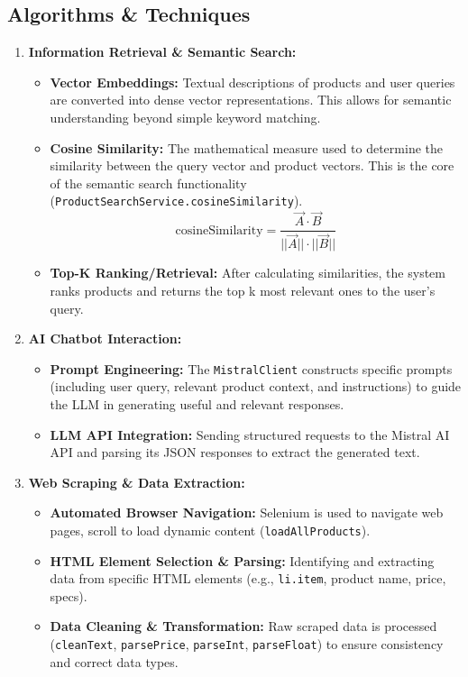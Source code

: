 \documentclass{article}
\begin{document}
\subsection{Algorithms \& Techniques}
\begin{enumerate}
    \item \textbf{Information Retrieval \& Semantic Search:}
    \begin{itemize}
        \item \textbf{Vector Embeddings:} Textual descriptions of products and user queries are converted into dense vector representations. This allows for semantic understanding beyond simple keyword matching.
        \item \textbf{Cosine Similarity:} The mathematical measure used to determine the similarity between the query vector and product vectors. This is the core of the semantic search functionality (\texttt{ProductSearchService.cosineSimilarity}).
        \[ \text{cosineSimilarity} = \frac{\vec{A} \cdot \vec{B}}{||\vec{A}|| \cdot ||\vec{B}||} \]
        \item \textbf{Top-K Ranking/Retrieval:} After calculating similarities, the system ranks products and returns the top k most relevant ones to the user's query.
    \end{itemize}
    \item \textbf{AI Chatbot Interaction:}
    \begin{itemize}
        \item \textbf{Prompt Engineering:} The \texttt{MistralClient} constructs specific prompts (including user query, relevant product context, and instructions) to guide the LLM in generating useful and relevant responses.
        \item \textbf{LLM API Integration:} Sending structured requests to the Mistral AI API and parsing its JSON responses to extract the generated text.
    \end{itemize}
    \item \textbf{Web Scraping \& Data Extraction:}
    \begin{itemize}
        \item \textbf{Automated Browser Navigation:} Selenium is used to navigate web pages, scroll to load dynamic content (\texttt{loadAllProducts}).
        \item \textbf{HTML Element Selection \& Parsing:} Identifying and extracting data from specific HTML elements (e.g., \texttt{li.item}, product name, price, specs).
        \item \textbf{Data Cleaning \& Transformation:} Raw scraped data is processed (\texttt{cleanText}, \texttt{parsePrice}, \texttt{parseInt}, \texttt{parseFloat}) to ensure consistency and correct data types.

\end{itemize}
\end{enumerate}
\end{document}

